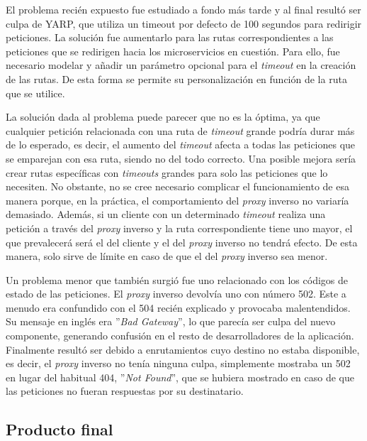 \documentclass[11pt,spanish,listoffigures]{tfgetsinf}
\begin{document}
El problema recién expuesto fue estudiado a fondo más tarde y al final resultó ser culpa de YARP, que utiliza un timeout por defecto de 100 segundos para redirigir peticiones. La solución fue aumentarlo para las rutas correspondientes a las peticiones que se redirigen hacia los microservicios en cuestión. Para ello, fue necesario modelar y añadir un parámetro opcional para el \emph{timeout} en la creación de las rutas. De esta forma se permite su personalización en función de la ruta que se utilice.

La solución dada al problema puede parecer que no es la óptima, ya que cualquier petición relacionada con una ruta de \emph{timeout} grande podría durar más de lo esperado, es decir, el aumento del \emph{timeout} afecta a todas las peticiones que se emparejan con esa ruta, siendo no del todo correcto. Una posible mejora sería crear rutas específicas con \emph{timeouts} grandes para solo las peticiones que lo necesiten. No obstante, no se cree necesario complicar el funcionamiento de esa manera porque, en la práctica, el comportamiento del \emph{proxy} inverso no variaría demasiado. Además, si un cliente con un determinado \emph{timeout} realiza una petición a través del \emph{proxy} inverso y la ruta correspondiente tiene uno mayor, el que prevalecerá será el del cliente y el del \emph{proxy} inverso no tendrá efecto. De esta manera, solo sirve de límite en caso de que el del \emph{proxy} inverso sea menor.

Un problema menor que también surgió fue uno relacionado con los códigos de estado de las peticiones. El \emph{proxy} inverso devolvía uno con número 502. Este a menudo era confundido con el 504 recién explicado y provocaba malentendidos. Su mensaje en inglés era ''\emph{Bad Gateway}'', lo que parecía ser culpa del nuevo componente, generando confusión en el resto de desarrolladores de la aplicación. Finalmente resultó ser debido a enrutamientos cuyo destino no estaba disponible, es decir, el \emph{proxy} inverso no tenía ninguna culpa, simplemente mostraba un 502 en lugar del habitual 404, ''\emph{Not Found}'', que se hubiera mostrado en caso de que las peticiones no fueran respuestas por su destinatario.


		\subsection{Producto final}
\end{document}
